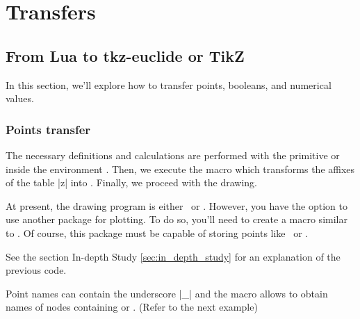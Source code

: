 
\newpage
\section{Transfers} %
\label{sec:transfers}
\subsection{From Lua to tkz-euclide or TikZ} %
\label{sub:fom_lua_to_tkz_euclide_or_tikz}

In this section, we'll explore how to transfer points, booleans, and numerical values.

\subsubsection{Points transfer} %
\label{ssub:points_transfer}
The necessary definitions and calculations are performed with the primitive  or inside the environment . Then, we execute the macro  which transforms the affixes of the table |z| into  . Finally, we proceed with the drawing.

At present, the drawing program is either \TIKZ\ or . However, you have the option to use another package for plotting. To do so, you'll need to create a macro similar to . Of course, this package must be capable of storing points like \TIKZ\ or . 

\vspace*{1em}

\begin{mybox}
\begin{SVerbatim}
\def\tkzGetNodes{\directlua{%
   for K,V in pairs(z) do
      local n,sd,ft
      n = string.len(K)
      if n >1 then
      _,_,ft, sd = string.find( K , "(.+)(.)" )  
     if sd == "p" then   K=ft.."'" end 
     _,_,xft, xsd = string.find( ft , "(.+)(.)" ) 
     if xsd == "p" then  K=xft.."'".."'" end 
       end    
  tex.print("\\coordinate ("..K..") at ("..V.re..","..V.im..") ;\\\\")
end}
}
\end{SVerbatim}
\end{mybox}
See the section In-depth Study \ref{sec:in_depth_study} for an explanation of the previous code.

Point names can contain the underscore |_| and the macro  allows to obtain names of nodes containing  or . (Refer to the next example)

